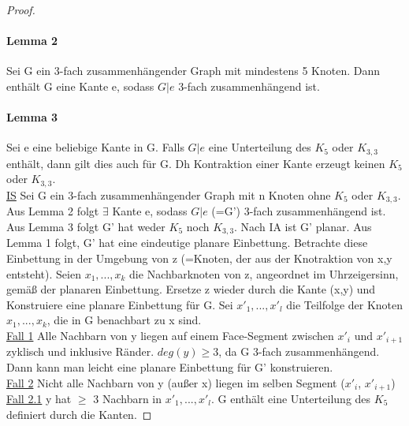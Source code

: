 \begin{proof}
\paragraph{Lemma 2} Sei G ein 3-fach zusammenhängender Graph mit mindestens 5 Knoten. Dann enthält G eine Kante e, sodass $ G|e $ 3-fach zusammenhängend ist.

\paragraph{Lemma 3} Sei e eine beliebige Kante in G. Falls $ G|e $ eine Unterteilung des $ K_5 $ oder $ K_{3,3} $ enthält, dann gilt dies auch für G. Dh Kontraktion einer Kante erzeugt keinen $ K_5 $ oder $ K_{3,3} $.\\
\underline{IS} Sei G ein 3-fach zusammenhängender Graph mit n Knoten ohne $ K_5 $ oder $ K_{3,3} $. Aus Lemma 2 folgt $ \exists $ Kante e, sodass $ G|e $ (=G') 3-fach zusammenhängend ist. Aus Lemma 3 folgt G' hat weder $ K_5 $ noch $ K_{3,3} $. Nach IA ist G' planar. Aus Lemma 1 folgt, G' hat eine eindeutige planare Einbettung. Betrachte diese Einbettung in der Umgebung von z (=Knoten, der aus der Knotraktion von x,y entsteht). Seien $ x_1, ..., x_k $ die Nachbarknoten von z, angeordnet im Uhrzeigersinn, gemäß der planaren Einbettung. Ersetze z wieder durch die Kante (x,y) und Konstruiere eine planare Einbettung für G. Sei $ x'_1, ... , x'_l $ die Teilfolge der Knoten $ x_1, ..., x_k $, die in G benachbart zu x sind. \\
\underline{Fall 1} Alle Nachbarn von y liegen auf einem Face-Segment zwischen $ x'_i $ und $ x'_{i+1} $ zyklisch und inklusive Ränder. $ deg(y) \geq 3 $, da G 3-fach zusammenhängend. Dann kann man leicht eine planare Einbettung für G' konstruieren. \\
\underline{Fall 2} Nicht alle Nachbarn von y (außer x) liegen im selben Segment ($ x'_i $, $ x'_{i+1} $) \\
\underline{Fall 2.1} y hat $ \geq $ 3 Nachbarn in $ x'_1, ... , x'_l $. G enthält eine Unterteilung des $ K_5 $ definiert durch die Kanten.


\end{proof}
